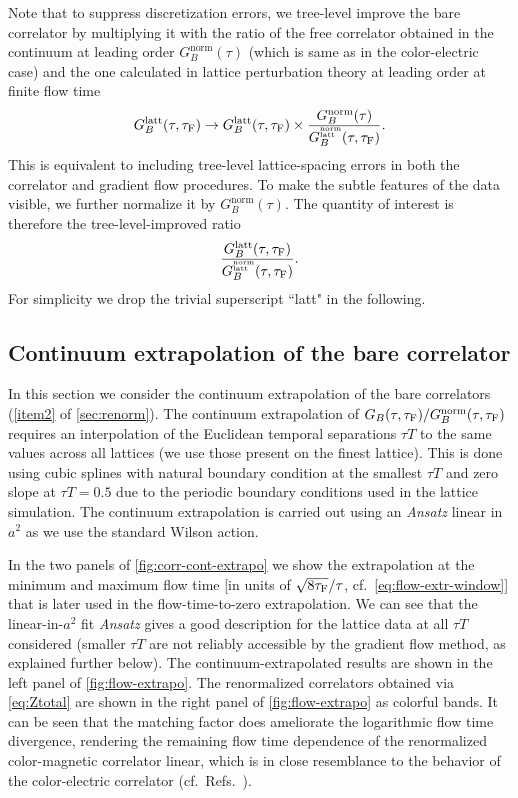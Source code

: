 \documentclass[floatfix,twocolumn,prd,showpacs,preprintnumbers,amsmath,nofootinbib,amssymb,superscriptaddress]{revtex4-2}
\newcommand{\stackss}[2]{{\begin{subarray}{l}{\textrm{\tiny #1}}\\[-0.3ex] \textrm{\tiny #2}\end{subarray}}} %
\def\ccites#1{Refs.~\cite{#1}} %
\begin{document}
Note that to suppress discretization errors, we tree-level improve \cite{Meyer:2009vj} the bare correlator by multiplying it with the ratio of the free correlator obtained in the continuum at leading order $G_B^{\mathrm{norm}}(\tau)$ \cite{Caron-Huot:2009ncn} (which is same as in the color-electric case) and the one calculated in lattice perturbation theory at leading order at finite flow time \cite{Altenkort:2023oms}
\begin{equation}
    G_B^{\rm{latt}}(\tau,\tauf) \rightarrow  G_B^{\rm{latt}}(\tau,\tauf) \times
    \frac{G_B^{\mathrm{norm}}(\tau)}{G_B^\stackss{norm}{latt}(\tau, \tauf)}.
\end{equation}
This is equivalent to including tree-level lattice-spacing errors in both the correlator and gradient flow procedures.
To make the subtle features of the data visible, we further normalize it by $G_B^{\mathrm{norm}}(\tau)$. The quantity of interest is therefore the tree-level-improved ratio
\begin{align}
    \label{Gimp}
    \frac{G_B^{\rm{latt}}(\tau,\tauf)}{G_B^\stackss{norm}{latt}(\tau, \tauf)}.
\end{align}
For simplicity we drop the trivial superscript ``latt" in the following.

\subsection{Continuum extrapolation of the bare correlator}



In this section we consider the continuum extrapolation of the bare correlators (\cref{item2} of \cref{sec:renorm}). The continuum extrapolation of $G_B(\tau,\tau_\mathrm{F})/G_B^\mathrm{norm}(\tau, \tau_\mathrm{F})$ requires an interpolation of the Euclidean temporal separations $\tau T$ to the same values across all lattices (we use those present on the finest lattice). This is done using cubic splines with natural boundary condition at the smallest $\tau T$ and zero slope at $\tau T=0.5$ due to the periodic boundary conditions used in the lattice simulation. The continuum extrapolation is carried out using an \textit{Ansatz} linear in $a^2$ as we use the standard Wilson action. 

In the two panels of \cref{fig:corr-cont-extrapo} we show the extrapolation at the minimum and maximum flow time [in units of $\sqrt{8\tau_\mathrm{F}}/\tau$, cf.\ \cref{eq:flow-extr-window}] that is later used in the flow-time-to-zero extrapolation. We can see that the linear-in-$a^2$ fit \textit{Ansatz} gives a good description for the lattice data at all $\tau T$ considered (smaller $\tau T$ are not reliably accessible by the gradient flow method, as explained further below). The continuum-extrapolated results are shown in the left panel of \cref{fig:flow-extrapo}. The renormalized correlators obtained via \cref{eq:Ztotal} are shown in the right panel of \cref{fig:flow-extrapo} as colorful bands. It can be seen that the matching factor does ameliorate the logarithmic flow time divergence, rendering the remaining flow time dependence of the renormalized color-magnetic correlator linear, which is in close resemblance to the behavior of the color-electric correlator (cf.\ \ccites{Altenkort:2020fgs, Altenkort:2023oms}).
\end{document}
